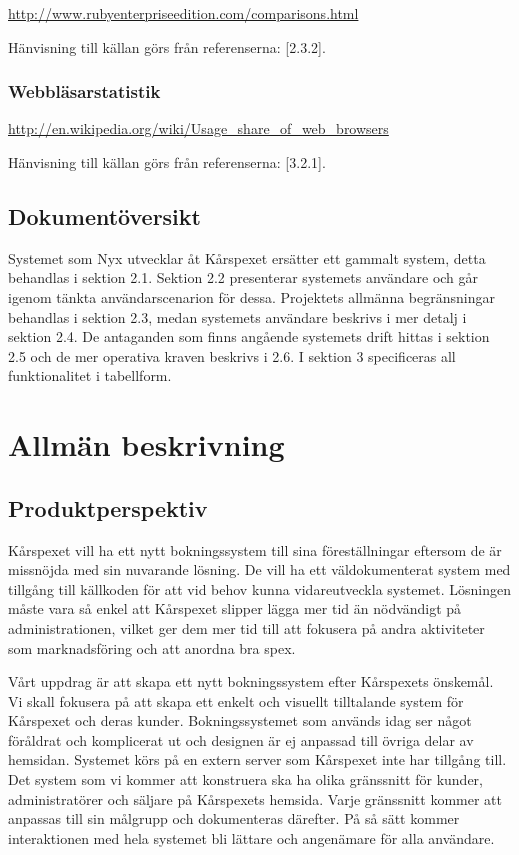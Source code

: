 \documentclass[a4paper, twoside, 11pt, titlepage]{article}
\begin{document}
		\url{http://www.rubyenterpriseedition.com/comparisons.html}

		Hänvisning till källan görs från referenserna: [2.3.2].

		\subsubsection{Webbläsarstatistik}


		\url{http://en.wikipedia.org/wiki/Usage\_share\_of\_web_browsers}

		Hänvisning till källan görs från referenserna: [3.2.1].

	\subsection{Dokumentöversikt}


	Systemet som Nyx utvecklar åt Kårspexet ersätter ett gammalt system, detta behandlas i sektion 2.1. Sektion 2.2 presenterar systemets användare och går igenom tänkta användarscenarion för dessa. Projektets allmänna begränsningar behandlas i sektion 2.3, medan systemets användare beskrivs i mer detalj i sektion 2.4. De antaganden som finns angående systemets drift hittas i sektion 2.5 och de mer operativa kraven beskrivs i 2.6. I sektion 3 specificeras all funktionalitet i tabellform.

\clearpage
\section{Allmän beskrivning}



	\subsection{Produktperspektiv}


	Kårspexet vill ha ett nytt bokningssystem till sina föreställningar eftersom de är missnöjda med sin nuvarande lösning. De vill ha ett väldokumenterat system med tillgång till källkoden för att vid behov kunna vidareutveckla systemet. Lösningen måste vara så enkel att Kårspexet slipper lägga mer tid än nödvändigt på administrationen, vilket ger dem mer tid till att fokusera på andra aktiviteter som marknadsföring och att anordna bra spex.

	Vårt uppdrag är att skapa ett nytt bokningssystem efter Kårspexets önskemål. Vi skall fokusera på att skapa ett enkelt och visuellt tilltalande system för Kårspexet och deras kunder. Bokningssystemet som används idag ser något föråldrat och komplicerat ut och designen är ej anpassad till övriga delar av hemsidan. Systemet körs på en extern server som Kårspexet inte har tillgång till. Det system som vi kommer att konstruera ska ha olika gränssnitt för kunder, administratörer och säljare på Kårspexets hemsida. Varje gränssnitt kommer att anpassas till sin målgrupp och dokumenteras därefter. På så sätt kommer interaktionen med hela systemet bli lättare och angenämare för alla användare.
\end{document}
